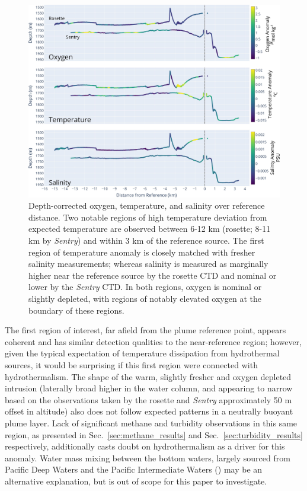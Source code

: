 \begin{figure}[h!]
    \centering
    \includegraphics[width=1\columnwidth]{figures/chap3_o2_temp_salt_over_distance.jpg}
    \caption{Depth-corrected oxygen, temperature, and salinity over reference distance. Two notable regions of high temperature deviation from expected temperature are observed between 6-12 km (rosette; 8-11 km by \emph{Sentry}) and within 3 km of the reference source. The first region of temperature anomaly is closely matched with fresher salinity measurements; whereas salinity is measured as marginally higher near the reference source by the rosette CTD and nominal or lower by the \emph{Sentry} CTD. In both regions, oxygen is nominal or slightly depleted, with regions of notably elevated oxygen at the boundary of these regions.}
    \label{fig:o2_temp_salt}
\end{figure}

The first region of interest, far afield from the plume reference point, appears coherent and has similar detection qualities to the near-reference region; however, given the typical expectation of temperature dissipation from hydrothermal sources, it would be surprising if this first region were connected with hydrothermalism. The shape of the warm, slightly fresher and oxygen depleted intrusion (laterally broad higher in the water column, and appearing to narrow based on the observations taken by the rosette and \emph{Sentry} approximately 50 m offset in altitude) also does not follow expected patterns in a neutrally buoyant plume layer. Lack of significant methane and turbidity observations in this same region, as presented in Sec.~\ref{sec:methane_results} and Sec.~\ref{sec:turbidity_results} respectively, additionally casts doubt on hydrothermalism as a driver for this anomaly. Water mass mixing between the bottom waters, largely sourced from Pacific Deep Waters and the Pacific Intermediate Waters (\cite{bray1988water}) may be an alternative explanation, but is out of scope for this paper to investigate. 


